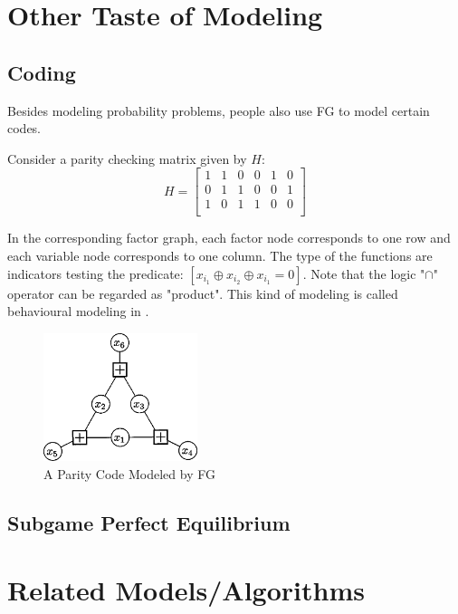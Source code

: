\documentclass[11pt,a4paper]{article}
\begin{document}
\section{Other Taste of Modeling}

\subsection{Coding}

Besides modeling probability problems, people also use FG to 
model certain codes. 

Consider a parity checking matrix given by $H$:
\begin{equation}
	H = \left[
	\begin{matrix}
		1 & 1 & 0 & 0 & 1 & 0 \\
0 & 1 & 1 & 0 & 0 & 1 \\
1 & 0 & 1 & 1 & 0 & 0 \\
	\end{matrix}
	\right]
\end{equation}

In the corresponding factor graph, each factor node corresponds
to one row and each variable node corresponds to one column. The 
type of the functions are indicators testing the predicate:
$[x_{i_1} \oplus x_{i_2} \oplus x_{i_1} = 0]$. Note that 
the logic "$\cap$" operator can be regarded as "product". 
This kind of modeling is called behavioural modeling in 
\cite{kschischang2001factor}. 

\begin{figure}[htb]
\centering
	\includegraphics[width=0.4\textwidth]{fig/kschischang2001-parity}
	\caption{A Parity Code Modeled by FG\cite{kschischang2001factor}}
\end{figure}


\subsection{Subgame Perfect Equilibrium}




\section{Related Models/Algorithms}
\end{document}
